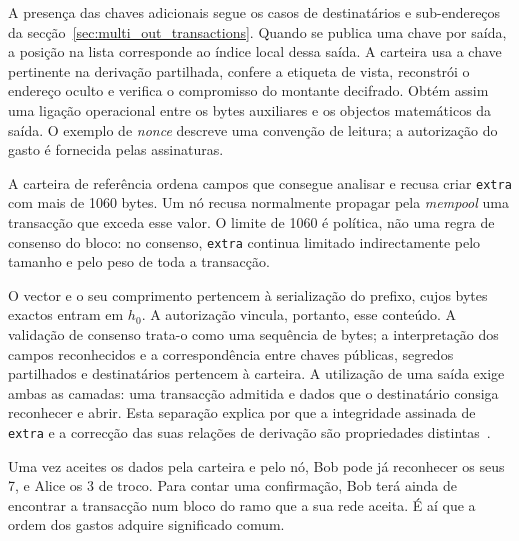 A presença das chaves adicionais segue os casos de destinatários e
sub-endereços da secção~\ref{sec:multi_out_transactions}. Quando se
publica uma chave por saída, a posição na lista corresponde ao índice
local dessa saída. A carteira usa a chave pertinente na derivação
partilhada, confere a etiqueta de vista, reconstrói o endereço oculto e
verifica o compromisso do montante decifrado. Obtém assim uma ligação
operacional entre os bytes auxiliares e os objectos matemáticos da
saída. O exemplo de \emph{nonce} descreve uma convenção de leitura;
a autorização do gasto é fornecida pelas assinaturas.

A carteira de referência ordena campos que consegue analisar e recusa criar
\texttt{extra} com mais de 1060 bytes. Um nó recusa normalmente propagar pela
\emph{mempool} uma transacção que exceda esse valor. O limite de 1060 é
política, não uma regra de consenso do bloco: no consenso, \texttt{extra}
continua limitado indirectamente pelo tamanho e pelo peso de toda a
transacção.

O vector e o seu comprimento pertencem à serialização do prefixo, cujos
bytes exactos entram em \(h_0\). A autorização vincula, portanto, esse
conteúdo. A validação de consenso trata-o como uma sequência de bytes;
a interpretação dos campos reconhecidos e a correspondência entre
chaves públicas, segredos partilhados e destinatários pertencem à
carteira. A utilização de uma saída exige ambas as camadas: uma
transacção admitida e dados que o destinatário consiga reconhecer e
abrir. Esta separação explica por que a integridade assinada de
\texttt{extra} e a correcção das suas relações de derivação são
propriedades distintas~\cite{monero-source-v16}.

Uma vez aceites os dados pela carteira e pelo nó, Bob pode já reconhecer
os seus 7, e Alice os 3 de troco. Para contar uma confirmação, Bob terá
ainda de encontrar a transacção num bloco do ramo que a sua rede aceita.
É aí que a ordem dos gastos adquire significado comum.
